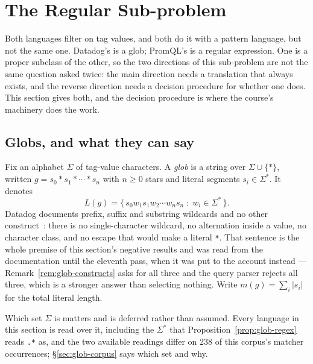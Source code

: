 
\section{The Regular Sub-problem}
\label{sec:regular}

Both languages filter on tag values, and both do it with a pattern language, but not the
same one. Datadog's is a glob; PromQL's is a regular expression. One is a proper subclass
of the other, so the two directions of this sub-problem are not the same question asked
twice: the main direction needs a translation that always exists, and the reverse
direction needs a decision procedure for whether one does. This section gives both, and
the decision procedure is where the course's machinery does the work.

\subsection{Globs, and what they can say}
\label{sec:globs}

\begin{definition}\label{def:glob}
Fix an alphabet $\Sigma$ of tag-value characters. A \emph{glob} is a string over
$\Sigma\cup\{*\}$, written $g=s_0*s_1*\cdots*s_n$ with $n\ge 0$ stars and literal
segments $s_i\in\Sigma^{*}$. It denotes
\[
L(g)=\{\,s_0w_1s_1w_2\cdots w_ns_n \;:\; w_i\in\Sigma^{*}\,\}.
\]
Datadog documents prefix, suffix and substring wildcards and no other
construct~\citep{ddfilter}: there is no single-character wildcard, no alternation inside
a value, no character class, and no escape that would make a literal \texttt{*}. That
sentence is the whole premise of this section's negative results and was read from the
documentation until the eleventh pass, when it was put to the account instead ---
Remark~\ref{rem:glob-constructs} asks for all three and the query parser rejects all
three, which is a stronger answer than selecting nothing. Write $m(g)=\sum_i|s_i|$ for
the total literal length.

Which set $\Sigma$ is matters and is deferred rather than assumed. Every language in
this section is read over it, including the $\Sigma^{*}$ that
Proposition~\ref{prop:glob-regex} reads \texttt{.*} as, and the two available readings
differ on $238$ of this corpus's matcher occurrences;
\S\ref{sec:glob-corpus} says which set and why.
\end{definition}

